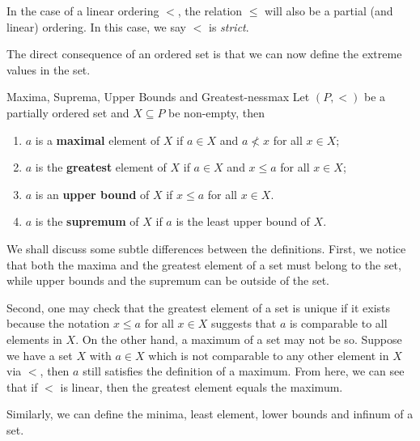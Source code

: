 \documentclass[math]{amznotes}
\theoremstyle{remark}
\begin{document}
In the case of a linear ordering $<$, the relation $\leq$ will also be a partial (and linear) ordering. In this case, we say $<$ is \textit{strict}.

The direct consequence of an ordered set is that we can now define the extreme values in the set.
\begin{dfnbox}{Maxima, Suprema, Upper Bounds and Greatest-ness}{max}
    Let $(P, <)$ be a partially ordered set and $X \subseteq P$ be non-empty, then 
    \begin{enumerate}
        \item $a$ is a {\color{red} \textbf{maximal}} element of $X$ if $a \in X$ and $a \not < x$ for all $x \in X$;
        \item $a$ is the {\color{red} \textbf{greatest}} element of $X$ if $a \in X$ and $x \leq a$ for all $x \in X$;
        \item $a$ is an {\color{red} \textbf{upper bound}} of $X$ if $x \leq a$ for all $x \in X$.
        \item $a$ is the {\color{red} \textbf{supremum}} of $X$ if $a$ is the least upper bound of $X$.
    \end{enumerate}
\end{dfnbox}
We shall discuss some subtle differences between the definitions. First, we notice that both the maxima and the greatest element of a set must belong to the set, while upper bounds and the supremum can be outside of the set.

Second, one may check that the greatest element of a set is unique if it exists because the notation $x \leq a$ for all $x \in X$ suggests that $a$ is comparable to all elements in $X$. On the other hand, a maximum of a set may not be so. Suppose we have a set $X$ with $a \in X$ which is not comparable to any other element in $X$ via $<$, then $a$ still satisfies the definition of a maximum. From here, we can see that if $<$ is linear, then the greatest element equals the maximum.

Similarly, we can define the minima, least element, lower bounds and infinum of a set.
\end{document}
